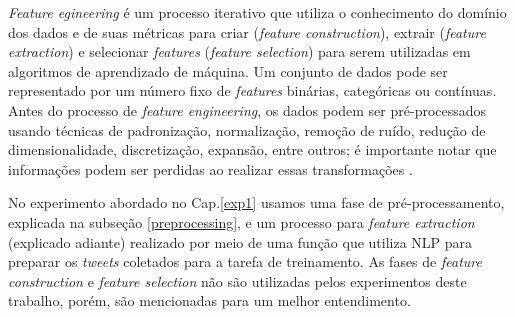 \documentclass[
	12pt,				%
	oneside,			%
	a4paper,			%
	english,			%
	brazil				%
	]{abntex2ppgsi}
\begin{document}



\textit{Feature egineering} é um processo iterativo que utiliza o conhecimento do domínio dos dados e de suas métricas para criar (\textit{feature construction}), extrair (\textit{feature extraction}) e selecionar \textit{features} (\textit{feature selection}) para serem utilizadas em algoritmos de aprendizado de máquina. Um conjunto de dados pode ser representado por um número fixo de \textit{features} binárias, categóricas ou contínuas. Antes do processo de \textit{feature engineering}, os dados podem ser pré-processados %
usando técnicas de padronização, normalização, remoção de ruído, redução de dimensionalidade, discretização, expansão, entre outros; é importante notar que informações podem ser perdidas ao realizar essas transformações \cite{guyon2006introduction}.

No experimento abordado no Cap.\ref{exp1} usamos uma fase de pré-processamento, explicada na subseção \ref{preprocessing}, e um processo para \textit{feature extraction} (explicado adiante) realizado por meio de uma função que utiliza NLP para preparar os \textit{tweets} coletados para a tarefa de treinamento. As fases de \textit{feature construction} e \textit{feature selection} não são utilizadas pelos experimentos deste trabalho, porém, são mencionadas para um melhor entendimento.
\end{document}
